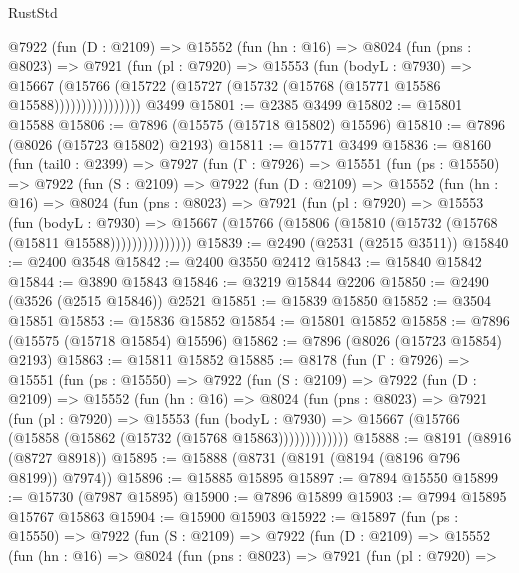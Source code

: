 \begin{lexlean}{RustStd}
\begin{coremodule}
            @7922
              (fun (D : @2109) =>
              @15552
                (fun (hn : @16) =>
                @8024
                  (fun (pns : @8023) =>
                  @7921
                    (fun (pl : @7920) =>
                    @15553
                      (fun (bodyL : @7930) =>
                      @15667
                        (@15766
                          (@15722 (@15727 (@15732 (@15768 (@15771 @15586 @15588))))))))))))))))
    @3499
@15801 := @2385 @3499
@15802 := @15801 @15588
@15806 := @7896 (@15575 (@15718 @15802) @15596)
@15810 := @7896 (@8026 (@15723 @15802) @2193)
@15811 := @15771 @3499
@15836 := @8160
    (fun (tail0 : @2399) =>
    @7927
      (fun (Γ : @7926) =>
      @15551
        (fun (ps : @15550) =>
        @7922
          (fun (S : @2109) =>
          @7922
            (fun (D : @2109) =>
            @15552
              (fun (hn : @16) =>
              @8024
                (fun (pns : @8023) =>
                @7921
                  (fun (pl : @7920) =>
                  @15553
                    (fun (bodyL : @7930) =>
                    @15667 (@15766 (@15806 (@15810 (@15732 (@15768 (@15811 @15588)))))))))))))))
@15839 := @2490 (@2531 (@2515 @3511))
@15840 := @2400 @3548
@15842 := @2400 @3550 @2412
@15843 := @15840 @15842
@15844 := @3890 @15843
@15846 := @3219 @15844 @2206
@15850 := @2490 (@3526 (@2515 @15846)) @2521
@15851 := @15839 @15850
@15852 := @3504 @15851
@15853 := @15836 @15852
@15854 := @15801 @15852
@15858 := @7896 (@15575 (@15718 @15854) @15596)
@15862 := @7896 (@8026 (@15723 @15854) @2193)
@15863 := @15811 @15852
@15885 := @8178
    (fun (Γ : @7926) =>
    @15551
      (fun (ps : @15550) =>
      @7922
        (fun (S : @2109) =>
        @7922
          (fun (D : @2109) =>
          @15552
            (fun (hn : @16) =>
            @8024
              (fun (pns : @8023) =>
              @7921
                (fun (pl : @7920) =>
                @15553
                  (fun (bodyL : @7930) =>
                  @15667 (@15766 (@15858 (@15862 (@15732 (@15768 @15863)))))))))))))
@15888 := @8191 (@8916 (@8727 @8918))
@15895 := @15888 (@8731 (@8191 (@8194 (@8196 @796 @8199)) @7974))
@15896 := @15885 @15895
@15897 := @7894 @15550
@15899 := @15730 (@7987 @15895)
@15900 := @7896 @15899
@15903 := @7994 @15895 @15767 @15863
@15904 := @15900 @15903
@15922 := @15897
    (fun (ps : @15550) =>
    @7922
      (fun (S : @2109) =>
      @7922
        (fun (D : @2109) =>
        @15552
          (fun (hn : @16) =>
          @8024
            (fun (pns : @8023) =>
            @7921
              (fun (pl : @7920) =>

\end{coremodule}
\end{lexlean}
